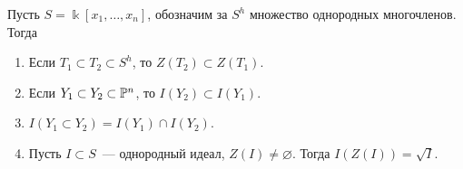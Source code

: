 	\begin{exercise}
 		Пусть $S = \Bbbk[x_1, \ldots, x_n]$, обозначим за $S^h$ множество однородных многочленов. Тогда 
 		\begin{enumerate}
 				 	\item Если $T_1 \subset T_2 \subset S^h$, то $Z(T_2) \subset Z(T_1)$.

 				 	\item Если $Y_1 \subset Y_2 \subset \mathbb{P}^n$, то $I(Y_2) \subset I(Y_1)$.

 				 	\item $I(Y_1 \subset Y_2) = I(Y_1) \cap I(Y_2)$.

 				 	\item Пусть $I \subset S$~--- однородный идеал, $Z(I) \neq \varnothing$. Тогда $I(Z(I)) = \sqrt{I}$. 
 				 \end{enumerate}		 
	\end{exercise}
 	








